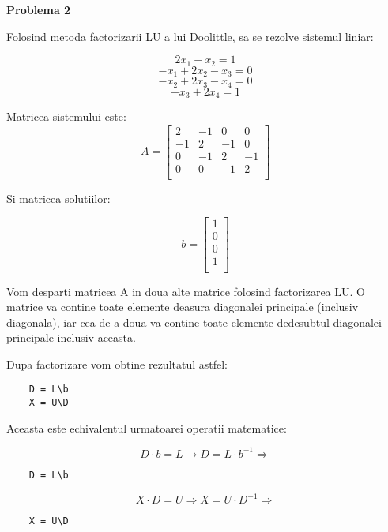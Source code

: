 \documentclass[a4paper,12pt]{article}
\begin{document}
\newpage
\large \textbf{Problema 2}
\normalsize \bigskip


Folosind metoda factorizarii LU a lui Doolittle, sa se rezolve sistemul liniar:

$$2x_1 - x_2 = 1$$
$$-x_1 + 2x_2 - x_3 = 0$$
$$-x_2 + 2x_3-x_4 = 0$$
$$-x_3 + 2x_4 = 1$$

Matricea sistemului este:
\[
    A = 
\begin{bmatrix}
    2 & -1 & 0 & 0 \\
    -1 & 2 & -1 & 0 \\
    0 & -1 & 2 & -1 \\
    0 & 0 & -1 & 2 \\
\end{bmatrix}
\]

Si matricea solutiilor:

\[
    b = 
\begin{bmatrix}
    1  \\
    0  \\
    0  \\
    1  \\
\end{bmatrix}
\]

Vom desparti matricea A in doua alte matrice folosind factorizarea LU. 
O matrice va contine toate elemente deasura diagonalei principale (inclusiv diagonala),
iar cea de a doua va contine toate elemente dedesubtul diagonalei principale inclusiv aceasta.

Dupa factorizare vom obtine rezultatul astfel:

\begin{lstlisting}
    D = L\b
    X = U\D
\end{lstlisting}

Aceasta este echivalentul urmatoarei operatii matematice:

$$D\cdot b = L \rightarrow D = L \cdot b^{-1} \Rightarrow$$

\begin{lstlisting}
    D = L\b
\end{lstlisting}

$$X\cdot D = U \Rightarrow X = U \cdot D^{-1} \Rightarrow$$

\begin{lstlisting}
    X = U\D
\end{lstlisting}
\end{document}
